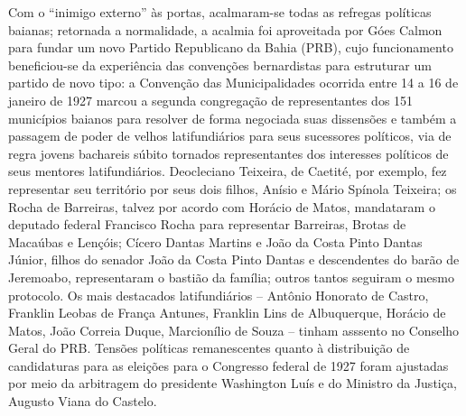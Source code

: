 Com o ``inimigo externo'' às portas, acalmaram-se todas as refregas políticas baianas; retornada a normalidade, a acalmia foi aproveitada por Góes Calmon para fundar um novo Partido Republicano da Bahia (PRB), cujo funcionamento beneficiou-se da experiência das convenções bernardistas para estruturar um partido de novo tipo: a Convenção das Municipalidades ocorrida entre 14 a 16 de janeiro de 1927 marcou a segunda congregação de representantes dos 151 municípios baianos para resolver de forma negociada suas dissensões e também a passagem de poder de velhos latifundiários para seus sucessores políticos, via de regra jovens bachareis súbito tornados representantes dos interesses políticos de seus mentores latifundiários. Deocleciano Teixeira, de Caetité, por exemplo, fez representar seu território por seus dois filhos, Anísio e Mário Spínola Teixeira; os Rocha de Barreiras, talvez por acordo com Horácio de Matos, mandataram o deputado federal Francisco Rocha para representar Barreiras, Brotas de Macaúbas e Lençóis; Cícero Dantas Martins e João da Costa Pinto Dantas Júnior, filhos do senador João da Costa Pinto Dantas e descendentes do barão de Jeremoabo, representaram o bastião da família; outros tantos seguiram o mesmo protocolo. Os mais destacados latifundiários -- Antônio Honorato de Castro, Franklin Leobas de França Antunes, Franklin Lins de Albuquerque, Horácio de Matos, João Correia Duque, Marcionílio de Souza -- tinham asssento no Conselho Geral do PRB. Tensões políticas remanescentes quanto à distribuição de candidaturas para as eleições para o Congresso federal de 1927 foram ajustadas por meio da arbitragem do presidente Washington Luís e do Ministro da Justiça, Augusto Viana do Castelo.

